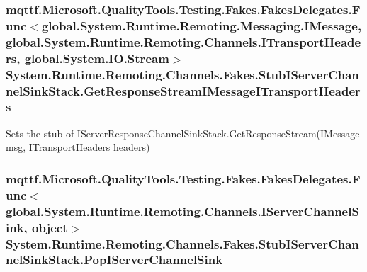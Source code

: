 \hypertarget{class_system_1_1_runtime_1_1_remoting_1_1_channels_1_1_fakes_1_1_stub_i_server_channel_sink_stack_a876477edd1c0cbc4d6cbd0b6a008a76c}{
\subsubsection[{Get\-Response\-Stream\-I\-Message\-I\-Transport\-Headers}]{\setlength{\rightskip}{0pt plus 5cm}mqttf.\-Microsoft.\-Quality\-Tools.\-Testing.\-Fakes.\-Fakes\-Delegates.\-Func$<$global.\-System.\-Runtime.\-Remoting.\-Messaging.\-I\-Message, global.\-System.\-Runtime.\-Remoting.\-Channels.\-I\-Transport\-Headers, global.\-System.\-I\-O.\-Stream$>$ System.\-Runtime.\-Remoting.\-Channels.\-Fakes.\-Stub\-I\-Server\-Channel\-Sink\-Stack.\-Get\-Response\-Stream\-I\-Message\-I\-Transport\-Headers}}\label{class_system_1_1_runtime_1_1_remoting_1_1_channels_1_1_fakes_1_1_stub_i_server_channel_sink_stack_a876477edd1c0cbc4d6cbd0b6a008a76c}


Sets the stub of I\-Server\-Response\-Channel\-Sink\-Stack.\-Get\-Response\-Stream(\-I\-Message msg, I\-Transport\-Headers headers)

\hypertarget{class_system_1_1_runtime_1_1_remoting_1_1_channels_1_1_fakes_1_1_stub_i_server_channel_sink_stack_a0c630752e2c633caeb8b7d4e373dc7f0}{
\subsubsection[{Pop\-I\-Server\-Channel\-Sink}]{\setlength{\rightskip}{0pt plus 5cm}mqttf.\-Microsoft.\-Quality\-Tools.\-Testing.\-Fakes.\-Fakes\-Delegates.\-Func$<$global.\-System.\-Runtime.\-Remoting.\-Channels.\-I\-Server\-Channel\-Sink, object$>$ System.\-Runtime.\-Remoting.\-Channels.\-Fakes.\-Stub\-I\-Server\-Channel\-Sink\-Stack.\-Pop\-I\-Server\-Channel\-Sink}}\label{class_system_1_1_runtime_1_1_remoting_1_1_channels_1_1_fakes_1_1_stub_i_server_channel_sink_stack_a0c630752e2c633caeb8b7d4e373dc7f0}


